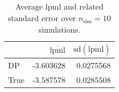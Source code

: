 \begin{table}[H]

\caption{Average lpml and related standard error over $n_{\text{sim}} = 10$ simulations.}
\centering
\begin{tabular}[t]{lrr}
\toprule
  & $\overbar{\text{lpml}}$ & $\text{sd}(\overbar{\text{lpml}})$\\
\midrule
DP & -3.603628 & 0.0275568\\
True & -3.587578 & 0.0285508\\
\bottomrule
\end{tabular}
\end{table}